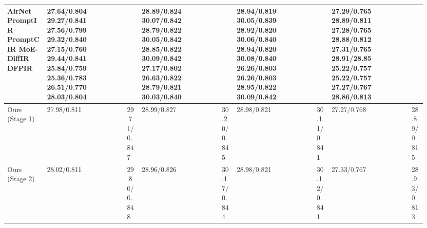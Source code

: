 \begin{tabular}{lllllllllllll}
\toprule
AirNet PromptIR PromptCIR MoE-DiffIR DFPIR & 27.64/0.804 29.27/0.841 27.56/0.799 29.32/0.840 27.15/0.760 29.44/0.841 25.84/0.759 25.36/0.783 26.51/0.770 28.03/0.804 &  &  & 28.89/0.824 30.07/0.842 28.79/0.822 30.05/0.842 28.85/0.822 30.09/0.842 27.17/0.802 26.63/0.822 28.79/0.821 30.03/0.840 &  &  & 28.94/0.819 30.05/0.839 28.92/0.820 30.06/0.840 28.94/0.820 30.08/0.840 26.26/0.803 26.26/0.803 28.95/0.822 30.09/0.842 &  &  & 27.29/0.765 28.89/0.811 27.28/0.765 28.88/0.812 27.31/0.765 28.91/28.85 25.22/0.757 25.22/0.757 27.27/0.767 28.86/0.813 &  &  \\
\midrule
Ours (Stage 1) & 27.98/0.811 &  & 29.71/0.847 & 28.99/0.827 &  & 30.20/0.845 & 28.98/0.821 &  & 30.11/0.841 & 27.27/0.768 &  & 28.89/0.815 \\
Ours (Stage 2) & 28.02/0.811 &  & 29.80/0.848 & 28.96/0.826 &  & 30.17/0.844 & 28.98/0.821 &  & 30.12/0.841 & 27.33/0.767 &  & 28.93/0.813 \\
\bottomrule
\end{tabular}
